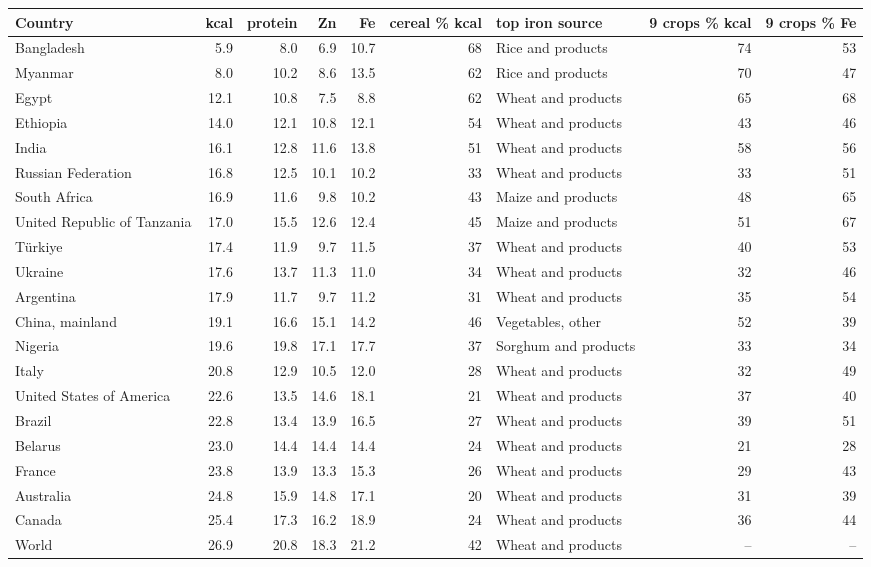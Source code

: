 \begin{tabular}{lrrrrrlrr}
\toprule
Country & kcal & protein & Zn & Fe & cereal \% kcal & top iron source & 9 crops \% kcal & 9 crops \% Fe \\
\midrule
Bangladesh & 5.9 & 8.0 & 6.9 & 10.7 & 68 & Rice and products & 74 & 53 \\
Myanmar & 8.0 & 10.2 & 8.6 & 13.5 & 62 & Rice and products & 70 & 47 \\
Egypt & 12.1 & 10.8 & 7.5 & 8.8 & 62 & Wheat and products & 65 & 68 \\
Ethiopia & 14.0 & 12.1 & 10.8 & 12.1 & 54 & Wheat and products & 43 & 46 \\
India & 16.1 & 12.8 & 11.6 & 13.8 & 51 & Wheat and products & 58 & 56 \\
Russian Federation & 16.8 & 12.5 & 10.1 & 10.2 & 33 & Wheat and products & 33 & 51 \\
South Africa & 16.9 & 11.6 & 9.8 & 10.2 & 43 & Maize and products & 48 & 65 \\
United Republic of Tanzania & 17.0 & 15.5 & 12.6 & 12.4 & 45 & Maize and products & 51 & 67 \\
Türkiye & 17.4 & 11.9 & 9.7 & 11.5 & 37 & Wheat and products & 40 & 53 \\
Ukraine & 17.6 & 13.7 & 11.3 & 11.0 & 34 & Wheat and products & 32 & 46 \\
Argentina & 17.9 & 11.7 & 9.7 & 11.2 & 31 & Wheat and products & 35 & 54 \\
China, mainland & 19.1 & 16.6 & 15.1 & 14.2 & 46 & Vegetables, other & 52 & 39 \\
Nigeria & 19.6 & 19.8 & 17.1 & 17.7 & 37 & Sorghum and products & 33 & 34 \\
Italy & 20.8 & 12.9 & 10.5 & 12.0 & 28 & Wheat and products & 32 & 49 \\
United States of America & 22.6 & 13.5 & 14.6 & 18.1 & 21 & Wheat and products & 37 & 40 \\
Brazil & 22.8 & 13.4 & 13.9 & 16.5 & 27 & Wheat and products & 39 & 51 \\
Belarus & 23.0 & 14.4 & 14.4 & 14.4 & 24 & Wheat and products & 21 & 28 \\
France & 23.8 & 13.9 & 13.3 & 15.3 & 26 & Wheat and products & 29 & 43 \\
Australia & 24.8 & 15.9 & 14.8 & 17.1 & 20 & Wheat and products & 31 & 39 \\
Canada & 25.4 & 17.3 & 16.2 & 18.9 & 24 & Wheat and products & 36 & 44 \\
World & 26.9 & 20.8 & 18.3 & 21.2 & 42 & Wheat and products & -- & -- \\
\bottomrule
\end{tabular}
